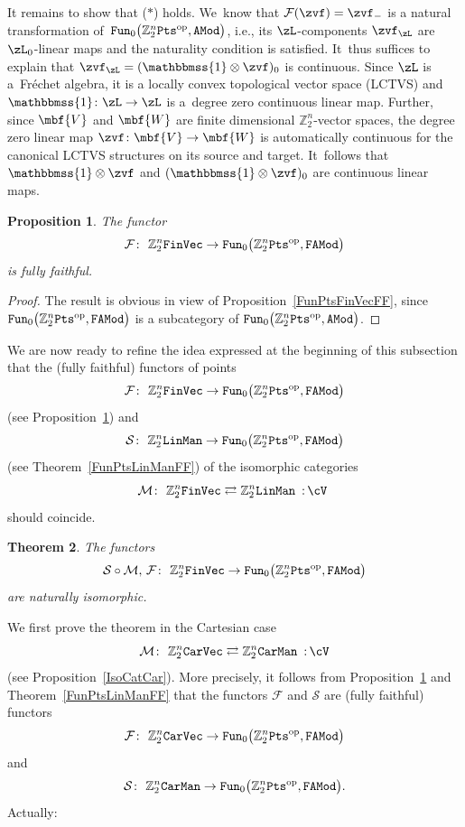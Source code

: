 \documentclass[pdftex]{sigma}%
\newcommand{\Id}{\mathbbmss{1}}
\newcommand{\op}[1]{\operatorname{#1}}
\newcommand{\Z}{{\mathbb Z}}
\def\cM{\cal M}
\def\cF{\mathcal{F}}
\def\cM{\mathcal{M}}
\newcommand{\0}{\otimes}
\newcommand{\z}{\Z_2^n}
\numberwithin{equation}{section}
\newtheorem{Theorem}{Theorem}[section]
\newtheorem{Proposition}[Theorem]{Proposition}
 { \theoremstyle{definition}
\newtheorem{Definition}[Theorem]{Definition}
\newtheorem{Example}[Theorem]{Example}
\newtheorem{Remark}[Theorem]{Remark} }
\begin{document}
It remains to show that ($\ast$) holds. We~know that $\cF(\zvf)=\zvf_-$ is a natural transformation of~${\tt Fun}_0\big(\z{\tt Pts}^{\op{op}},{\tt AMod}\big)$, i.e., its $\zL$-components $\zvf_\zL$ are $\zL_0$-linear maps and the naturality condition is satisfied. It~thus suffices to explain that $\zvf_\zL=(\Id\0\zvf)_0$ is continuous. Since $\zL$ is a~Fr\'echet algebra, it is a locally convex topological vector space ({\small LCTVS}) and $\Id\colon \zL\to\zL$ is a~degree zero continuous linear map. Further, since $\mbf{V}$ and $\mbf{W}$ are finite dimensional $\z$-vector spaces, the deg\-ree zero linear map $\zvf\colon \mbf{V}\to\mbf{W}$ is automatically continuous for the canonical {\small LCTVS} structures on its source and target. It~follows that $\Id\0\zvf$ and $(\Id\0\zvf)_0$ are continuous linear maps.

\begin{Proposition}\label{FunPtsFinVecFF2}
The functor
\[
\cF\colon\ \z{\tt FinVec}\to{\tt Fun}_0\big(\z{\tt Pts}^{\op{op}},{\tt FAMod}\big)
\]
is fully faithful.
\end{Proposition}

\begin{proof}
The result is obvious in view of Proposition~\ref{FunPtsFinVecFF}, since ${\tt Fun}_0\big(\z{\tt Pts}^{\op{op}},{\tt FAMod}\big)$ is a subcategory of ${\tt Fun}_0\big(\z{\tt Pts}^{\op{op}},{\tt AMod}\big)$.
\end{proof}

\newcommand{\cS}{\mathcal{S}}

We are now ready to refine the idea expressed at the beginning of this subsection that the (fully faithful) functors of points
\[
\cF\colon\ \z{\tt FinVec}\to{\tt Fun}_0\big(\z{\tt Pts}^{\op{op}},{\tt FAMod}\big)
\]
(see Proposition~\ref{FunPtsFinVecFF2}) and
\[
\mathcal{S}\colon\ \z{\tt LinMan}\to{\tt Fun}_0\big(\z{\tt Pts}^{\op{op}},\tt FAMod\big)
\]
(see Theorem~\ref{FunPtsLinManFF}) of the isomorphic categories
\[
\cM\colon\ \z{\tt FinVec}\rightleftarrows\z{\tt LinMan}\ \,{:}\, \cV\
\]
should coincide.

\begin{Theorem}\label{NatIsoSMFGene}
The functors
\[
\mathcal{S}\circ\cM,\, \cF\colon\ \z{\tt FinVec}\to{\tt Fun}_0\big(\z{\tt Pts}^{\op{op}},{\tt FAMod}\big)
\]
are naturally isomorphic.
\end{Theorem}

\newcommand{\sfi}{\textsf{I}}

We first prove the theorem in the Cartesian case
\[
\mathcal{M}\colon\ \Z_2^n{\tt CarVec}\rightleftarrows\Z_2^n\tt CarMan\ \,{:}\, \cV
\]
(see Proposition~\ref{IsoCatCar}). More precisely, it follows from Proposition~\ref{FunPtsFinVecFF2} and Theorem~\ref{FunPtsLinManFF} that the functors $\cF$ and $\cS$ are (fully faithful) functors
\[
\cF\colon\ \z{\tt CarVec}\to{\tt Fun}_0\big(\z{\tt Pts}^{\op{op}},{\tt FAMod}\big)
\]
and
\[
\mathcal S\colon\ \z{\tt CarMan}\to{\tt Fun}_0\big(\z{\tt Pts}^{\op{op}},{\tt FAMod}\big).
\]
Actually:
\end{document}
